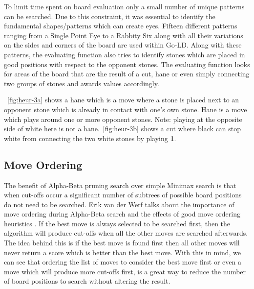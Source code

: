 \documentclass{l4proj}
\newcommand{\bo}[1]{\textbf{#1}}
\begin{document}
To limit time spent on board evaluation only a small number of unique patterns can be searched. Due to this constraint, it was essential to identify the fundamental shapes/patterns which can create eyes. Fifteen different patterns ranging from a Single Point Eye to a Rabbity Six along with all their variations on the sides and corners of the board are used within Go-LD.  Along with these patterns, the evaluating function also tries to identify stones which are placed in good positions with respect to the opponent stones. The evaluating function looks for areas of the board that are the result of a cut, hane or even simply connecting two groups of stones and awards values accordingly.


~\autoref{fig:heur-3a} shows a hane which is a move where a stone is placed next to an opponent stone which is already in contact with one’s own stone. Hane is a move which plays around one or more opponent stones. Note: playing at the opposite side of white here is not a hane.~\autoref{fig:heur-3b} shows a cut where black can stop white from connecting the two white stones by playing \bo{1}.





\subsection{Move Ordering}
The benefit of Alpha-Beta pruning search over simple Minimax search is that when cut-offs occur a significant number of subtrees of possible board positions do not need to be searched. Erik van der Werf talks about the importance of move ordering during Alpha-Beta search and the effects of good move ordering heuristics \citep{ErikvanderWerf2004}. If the best move is always selected to be searched first, then the algorithm will produce cut-offs when all the other moves are searched afterwards. The idea behind this is if the best move is found first then all other moves will never return a score which is better than the best move. With this in mind, we can see that ordering the list of moves to consider the best move first or even a move which will produce more cut-offs first, is a great way to reduce the number of board positions to search without altering the result.
\end{document}
